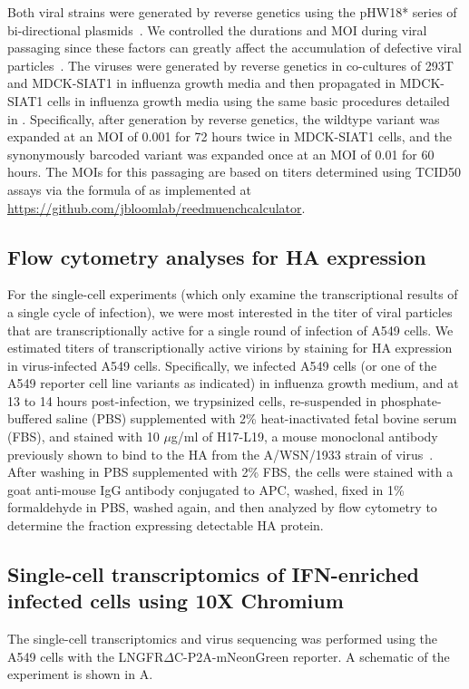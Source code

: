 \documentclass[9pt,lineno]{elife}
\begin{document}
Both viral strains were generated by reverse genetics using the pHW18* series of bi-directional plasmids~\citep{hoffmann2000dna}.
We controlled the durations and MOI during viral passaging since these factors can greatly affect the accumulation of defective viral particles~\citep{xue2016propagation}.
The viruses were generated by reverse genetics in co-cultures of 293T and MDCK-SIAT1 in influenza growth media and then propagated in MDCK-SIAT1 cells in influenza growth media using the same basic procedures detailed in \citet{russell2018extreme}.
Specifically, after generation by reverse genetics, the wildtype variant was expanded at an MOI of 0.001 for 72 hours twice in MDCK-SIAT1 cells, and the synonymously barcoded variant was expanded once at an MOI of 0.01 for 60 hours.
The MOIs for this passaging are based on titers determined using TCID50 assays via the formula of \citet{reed1938simple} as implemented at \url{https://github.com/jbloomlab/reedmuenchcalculator}.

\subsection{Flow cytometry analyses for HA expression}
For the single-cell experiments (which only examine the transcriptional results of a single cycle of infection), we were most interested in the titer of viral particles that are transcriptionally active for a single round of infection of A549 cells.
We estimated titers of transcriptionally active virions by staining for HA expression in virus-infected A549 cells.
Specifically, we infected A549 cells (or one of the A549 reporter cell line variants as indicated) in influenza growth medium, and at 13 to 14 hours post-infection, we trypsinized cells, re-suspended in phosphate-buffered saline (PBS) supplemented with 2\% heat-inactivated fetal bovine serum (FBS), and stained with 10 $\mu$g/ml of H17-L19, a mouse monoclonal antibody previously shown to bind to the HA from the A/WSN/1933 strain of virus~\citep{doud2017complete}.
After washing in PBS supplemented with 2\% FBS, the cells were stained with a goat anti-mouse IgG antibody conjugated to APC, washed, fixed in 1\% formaldehyde in PBS, washed again, and then analyzed by flow cytometry to determine the fraction expressing detectable HA protein.

\subsection{Single-cell transcriptomics of IFN-enriched infected cells using 10X Chromium}
The single-cell transcriptomics and virus sequencing was performed using the A549 cells with the LNGFR$\Delta$C-P2A-mNeonGreen reporter.
A schematic of the experiment is shown in A.
\end{document}
